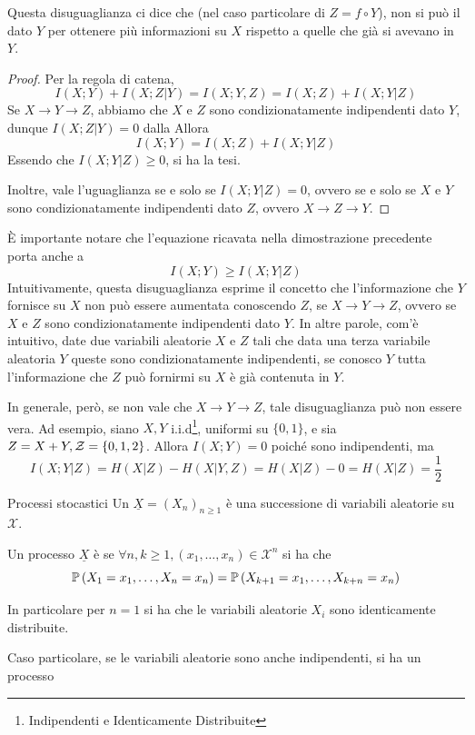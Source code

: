 \begin{observation}{}
  Questa disuguaglianza ci dice che (nel caso particolare di \(Z = f \circ Y\)), non si può  il dato \(Y\) per ottenere più informazioni su \(X\) rispetto a quelle che già si avevano in \(Y\).
\end{observation}

\begin{proof}
  Per la regola di catena,
  \[I(X;Y)+I(X;Z|Y)=I(X;Y,Z) = I(X;Z) + I(X;Y|Z)\]
  Se \(X \to Y \to Z\), abbiamo che \(X\) e \(Z\) sono condizionatamente indipendenti dato \(Y\), dunque \(I(X;Z|Y)=0\) dalla 
  Allora
  \[I(X;Y) = I(X;Z) + I(X;Y|Z) \]
  Essendo che \(I(X;Y|Z) \geq 0\), si ha la tesi.

  Inoltre, vale l'uguaglianza se e solo se \(I(X;Y|Z)=0\), ovvero se e solo se \(X\) e \(Y\) sono condizionatamente indipendenti dato \(Z\), ovvero \(X\to Z \to Y\).
\end{proof}

È importante notare che l'equazione ricavata nella dimostrazione precedente porta anche a
\[I(X;Y) \geq I(X;Y|Z)\]
Intuitivamente, questa disuguaglianza esprime il concetto che l'informazione che \(Y\) fornisce su \(X\) non può essere aumentata conoscendo \(Z\), se \(X \to Y \to Z\), ovvero se \(X\) e \(Z\) sono condizionatamente indipendenti dato \(Y\).
In altre parole, com'è intuitivo, date due variabili aleatorie \(X\) e \(Z\) tali che data una terza variabile aleatoria \(Y\) queste sono condizionatamente indipendenti, se conosco \(Y\) tutta l'informazione che \(Z\) può fornirmi su \(X\) è già contenuta in \(Y\).

In generale, però, se non vale che \(X \to Y \to Z\), tale disuguaglianza può non essere vera.
Ad esempio, siano \(X, Y\) i.i.d\footnote{Indipendenti e Identicamente Distribuite}, uniformi su \(\{0,1\}\), e sia \(Z = X + Y, \mathcal{Z} = \set{0,1,2}\).
Allora \(I(X;Y) = 0\) poiché sono indipendenti, ma 
\[I(X;Y|Z) = H(X|Z) - H(X|Y,Z) = H(X|Z) - 0 = H(X|Z) = \frac{1}{2}\]

\begin{definition}{Processi stocastici}
  Un  \(\underline{X} = {(X_n)}_{n\geq 1}\) è una successione di variabili aleatorie su \(\mathcal{X}\).

  Un processo \(\underline{X}\) è  se \(\forall n, k \geq 1, (x_1, \ldots, x_n) \in \mathcal{X}^n\) si ha che
  \[\Prob[X_1 = x_1, \ldots ,X_n = x_n] = \Prob[X_{k+1} = x_1, \ldots, X_{k+n} = x_n]\]

  In particolare per \(n=1\) si ha che le variabili aleatorie \(X_i\) sono identicamente distribuite.

  Caso particolare, se le variabili aleatorie sono anche indipendenti, si ha un processo 
\end{definition}

